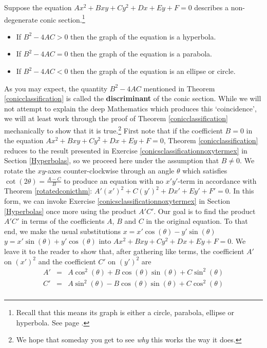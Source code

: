 \smallskip
\colorbox{ResultColor}{\bbm
\begin{thm} \label{conicclassification} Suppose the equation $Ax^2 + Bxy + Cy^2 + Dx + Ey + F = 0$ describes a non-degenerate conic section.\footnote{Recall that this means its graph is either a circle, parabola, ellipse or hyperbola.  See page \pageref{degenerateconics}.}

\begin{itemize}

\item If $B^2 - 4AC > 0$ then the graph of the equation is a hyperbola.

\item If $B^2 - 4AC =0$ then the graph of the equation is a parabola.

\item If $B^2 - 4AC < 0$ then the graph of the equation is an ellipse or circle.

\end{itemize}

\end{thm}
\ebm}
\smallskip 

As you may expect, the quantity $B^2 - 4AC$ mentioned in Theorem \ref{conicclassification} is called the \textbf{discriminant} of the conic section.  While we will not attempt to explain the deep Mathematics which produces this `coincidence', we will at least work through the proof of Theorem \ref{conicclassification} mechanically to show that it is true.\footnote{We hope that someday you get to see \emph{why} this works the way it does.}  First note that if the coefficient $B=0$ in the equation $Ax^2 + Bxy + Cy^2 + Dx + Ey + F = 0$, Theorem \ref{conicclassification} reduces to the result presented in Exercise \ref{conicsclassificationnoxytermex} in Section \ref{Hyperbolas}, so we proceed here under the assumption that $B \neq 0$.  We rotate the $xy$-axes counter-clockwise through an angle $\theta$ which satisfies $\cot(2\theta) = \frac{A-C}{B}$ to produce an equation with no $x'y'$-term in accordance with  Theorem \ref{rotatedconicthm}:  $A'(x')^2 +C(y')^2 + Dx' + Ey' + F'= 0$.  In this form, we can invoke Exercise \ref{conicsclassificationnoxytermex} in Section \ref{Hyperbolas} once more using the product $A'C'$.  Our goal is to find the product $A'C'$ in terms of the coefficients $A$, $B$ and $C$ in the original equation.  To that end, we make the usual substitutions $x = x' \cos(\theta) - y' \sin(\theta)$  $y =  x'\sin(\theta) + y'\cos(\theta)$ into  $Ax^2 + Bxy + Cy^2 + Dx + Ey + F = 0$. We leave it to the reader to show that, after gathering like terms, the coefficient $A'$ on $(x')^2$ and the coefficient $C'$ on $(y')^2$ are
\vspace{-.1in}
\enlargethispage{.2in}
\[ \begin{array}{rcll}

A' & = & A \cos^{2}(\theta) + B \cos(\theta) \sin(\theta) + C \sin^{2}(\theta) \\ [3pt]
C' & = & A \sin^{2}(\theta) - B \cos(\theta) \sin(\theta) + C \cos^{2}(\theta) \\
 
\end{array} \]

